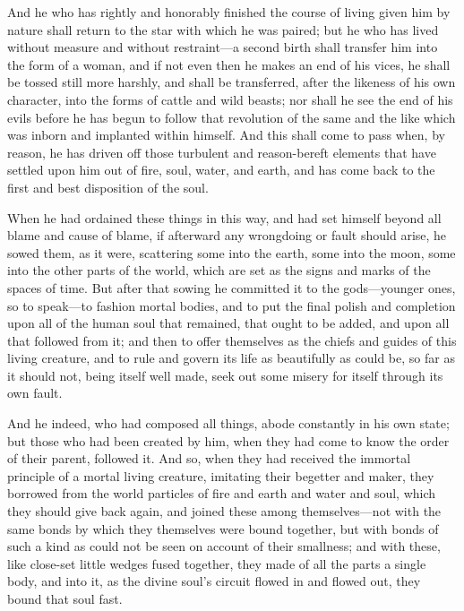  And he who has rightly and honorably finished the course of living given him by nature shall return to the star with which he was paired; but he who has lived without measure and without restraint—a second birth shall transfer him into the form of a woman, and if not even then he makes an end of his vices, he shall be tossed still more harshly, and shall be transferred, after the likeness of his own character, into the forms of cattle and wild beasts; nor shall he see the end of his evils before he has begun to follow that revolution of the same and the like which was inborn and implanted within himself. And this shall come to pass when, by reason, he has driven off those turbulent and reason-bereft elements that have settled upon him out of fire, soul, water, and earth, and has come back to the first and best disposition of the soul.

 When he had ordained these things in this way, and had set himself beyond all blame and cause of blame, if afterward any wrongdoing or fault should arise, he sowed them, as it were, scattering some into the earth, some into the moon, some into the other parts of the world, which are set as the signs and marks of the spaces of time. But after that sowing he committed it to the gods—younger ones, so to speak—to fashion mortal bodies, and to put the final polish and completion upon all of the human soul that remained, that ought to be added, and upon all that followed from it; and then to offer themselves as the chiefs and guides of this living creature, and to rule and govern its life as beautifully as could be, so far as it should not, being itself well made, seek out some misery for itself through its own fault.

 And he indeed, who had composed all things, abode constantly in his own state; but those who had been created by him, when they had come to know the order of their parent, followed it. And so, when they had received the immortal principle of a mortal living creature, imitating their begetter and maker, they borrowed from the world particles of fire and earth and water and soul, which they should give back again, and joined these among themselves—not with the same bonds by which they themselves were bound together, but with bonds of such a kind as could not be seen on account of their smallness; and with these, like close-set little wedges fused together, they made of all the parts a single body, and into it, as the divine soul's circuit flowed in and flowed out, they bound that soul fast.

